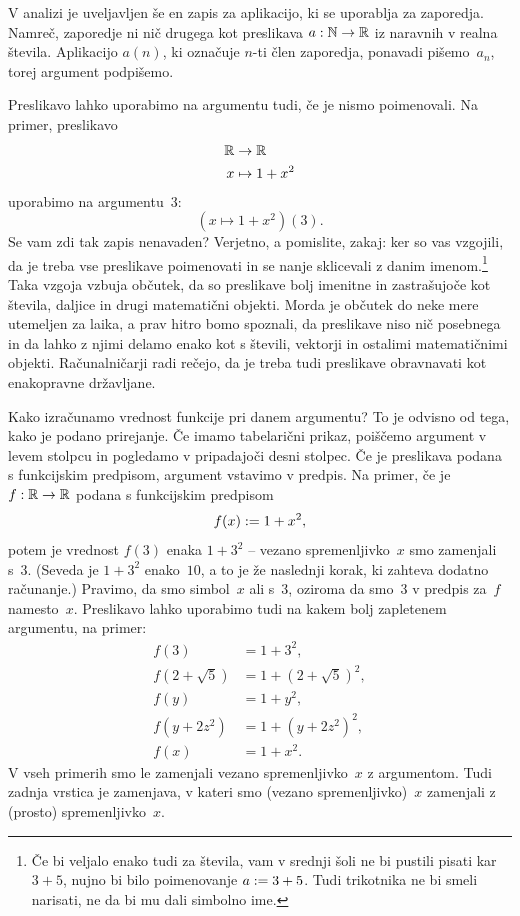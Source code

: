 V analizi je uveljavljen še en zapis za aplikacijo, ki se uporablja za zaporedja. Namreč,
zaporedje ni nič drugega kot preslikava $a : \mathbb{N} \to \mathbb{R}$ iz naravnih v realna števila.
Aplikacijo $a(n)$, ki označuje $n$-ti člen zaporedja, ponavadi pišemo~$a_n$, torej
argument podpišemo.

Preslikavo lahko uporabimo na argumentu tudi, če je nismo poimenovali. Na primer,
preslikavo
%
\begin{align*}
  \mathbb{R} &\to \mathbb{R} \\
  x &\mapsto 1 + x^2
\end{align*}
%
uporabimo na argumentu~$3$:
%
\begin{equation*}
  (x \mapsto 1 + x^2)(3).
\end{equation*}
%
Se vam zdi tak zapis nenavaden? Verjetno, a pomislite, zakaj: ker so vas vzgojili, da
je treba vse preslikave poimenovati in se nanje sklicevali z danim imenom.\footnote{Če bi veljalo enako tudi za števila, vam v srednji šoli ne bi pustili pisati kar $3 + 5$, nujno bi bilo poimenovanje $a \mathrel{{:}{=}} 3 + 5$. Tudi trikotnika ne bi smeli narisati, ne da bi mu dali simbolno ime.}
%
Taka vzgoja vzbuja občutek, da so preslikave bolj imenitne in zastrašujoče kot števila, daljice in drugi matematični objekti. Morda je občutek do neke mere utemeljen za laika, a prav hitro bomo spoznali, da preslikave niso nič
posebnega in da lahko z njimi delamo enako kot s števili, vektorji in ostalimi matematičnimi objekti. Računalničarji radi rečejo, da je treba tudi preslikave obravnavati kot enakopravne državljane.

Kako izračunamo vrednost funkcije pri danem argumentu? To je odvisno od tega,
kako je podano prirejanje. Če imamo tabelarični prikaz, poiščemo argument v levem stolpcu
in pogledamo v pripadajoči desni stolpec. Če je preslikava podana s funkcijskim predpisom, argument
vstavimo v predpis. Na primer, če je $f : \mathbb{R} \to \mathbb{R}$ podana s funkcijskim predpisom
%
\begin{equation*}
  f(x) \mathrel{{:}{=}} 1 + x^2,
\end{equation*}
%
potem je vrednost $f(3)$ enaka $1 + 3^2$ -- vezano spremenljivko~$x$ smo zamenjali s~$3$. (Seveda je $1 + 3^2$ enako~$10$, a to je že naslednji korak, ki zahteva dodatno računanje.)
Pravimo, da smo simbol~$x$  ali
 s~$3$, oziroma da smo~$3$  v predpis za~$f$ namesto~$x$. 
%
Preslikavo lahko uporabimo tudi na kakem bolj zapletenem argumentu, na primer:
%
\begin{align*}
  f(3) &= 1 + 3^2, \\
  f(2 + \sqrt{5}) &= 1 + (2 + \sqrt{5})^2, \\
  f(y) &= 1 + y^2, \\
  f(y + 2 z^2) &= 1 + (y + 2 z^2)^2, \\
  f(x) &= 1 + x^2.
\end{align*}
%
V vseh primerih smo le zamenjali vezano spremenljivko~$x$ z argumentom.
%
Tudi zadnja vrstica je zamenjava, v kateri smo (vezano spremenljivko)~$x$ zamenjali z (prosto) spremenljivko~$x$.

